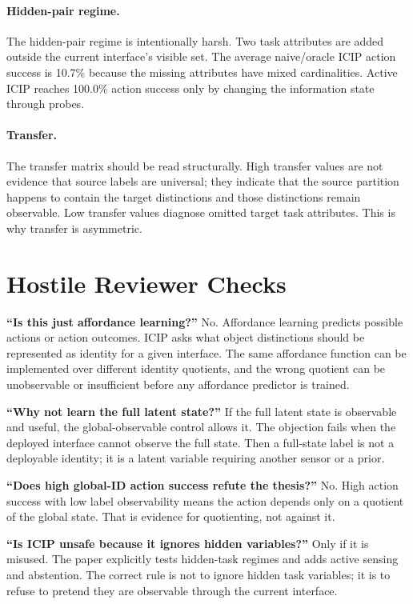 \documentclass{article}
\newcommand{\icip}{\textsc{ICIP}}
\begin{document}
\paragraph{Hidden-pair regime.}
The hidden-pair regime is intentionally harsh.
Two task attributes are added outside the current interface's visible set.
The average naive/oracle \icip{} action success is 10.7\% because the missing attributes have mixed cardinalities.
Active \icip{} reaches 100.0\% action success only by changing the information state through probes.

\paragraph{Transfer.}
The transfer matrix should be read structurally.
High transfer values are not evidence that source labels are universal; they indicate that the source partition happens to contain the target distinctions and those distinctions remain observable.
Low transfer values diagnose omitted target task attributes.
This is why transfer is asymmetric.

\section{Hostile Reviewer Checks}

\textbf{``Is this just affordance learning?''}
No.
Affordance learning predicts possible actions or action outcomes.
\icip{} asks what object distinctions should be represented as identity for a given interface.
The same affordance function can be implemented over different identity quotients, and the wrong quotient can be unobservable or insufficient before any affordance predictor is trained.

\textbf{``Why not learn the full latent state?''}
If the full latent state is observable and useful, the global-observable control allows it.
The objection fails when the deployed interface cannot observe the full state.
Then a full-state label is not a deployable identity; it is a latent variable requiring another sensor or a prior.

\textbf{``Does high global-ID action success refute the thesis?''}
No.
High action success with low label observability means the action depends only on a quotient of the global state.
That is evidence for quotienting, not against it.

\textbf{``Is \icip{} unsafe because it ignores hidden variables?''}
Only if it is misused.
The paper explicitly tests hidden-task regimes and adds active sensing and abstention.
The correct rule is not to ignore hidden task variables; it is to refuse to pretend they are observable through the current interface.
\end{document}
